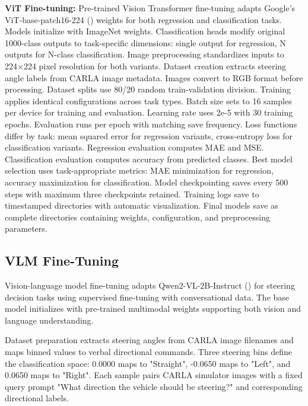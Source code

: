 \textbf{ViT Fine-tuning:} Pre-trained Vision Transformer fine-tuning adapts Google's ViT-base-patch16-224 (\cite{google2021vitbasepatch16224}) weights for both regression and classification tasks. Models initialize with ImageNet weights. Classification heads modify original 1000-class outputs to task-specific dimensions: single output for regression, N outputs for N-class classification.
Image preprocessing standardizes inputs to 224×224 pixel resolution for both variants. Dataset creation extracts steering angle labels from CARLA image metadata. Images convert to RGB format before processing. Dataset splits use 80/20 random train-validation division.
Training applies identical configurations across task types. Batch size sets to 16 samples per device for training and evaluation. Learning rate uses 2e-5 with 30 training epochs. Evaluation runs per epoch with matching save frequency.
Loss functions differ by task: mean squared error for regression variants, cross-entropy loss for classification variants. Regression evaluation computes MAE and MSE. Classification evaluation computes accuracy from predicted classes. Best model selection uses task-appropriate metrics: MAE minimization for regression, accuracy maximization for classification.
Model checkpointing saves every 500 steps with maximum three checkpoints retained. Training logs save to timestamped directories with automatic visualization. Final models save as complete directories containing weights, configuration, and preprocessing parameters.


\subsection{VLM Fine-Tuning}
Vision-language model fine-tuning adapts Qwen2-VL-2B-Instruct (\cite{bai2023qwen}) for steering decision tasks using supervised fine-tuning with conversational data. The base model initializes with pre-trained multimodal weights supporting both vision and language understanding.

Dataset preparation extracts steering angles from CARLA image filenames and maps binned  values to verbal directional commands. Three steering bins define the classification space: 0.0000 maps to "Straight", -0.0650 maps to "Left", and 0.0650 maps to "Right". Each sample pairs CARLA simulator images with a fixed query prompt "What direction the vehicle should be steering?" and corresponding directional labels.


